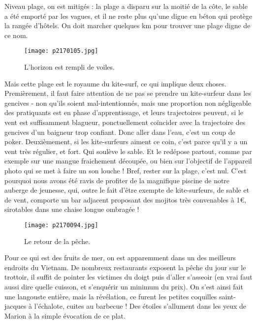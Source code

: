 \documentclass{book}
\begin{document}
Niveau plage, on est mitigés : la plage a disparu sur la moitié de la côte, le sable a été emporté par les vagues, et il ne reste plus qu'une digue en béton qui protège la rangée d'hôtels. On doit marcher quelques km pour trouver une plage digne de ce nom.


\begin{figure}[h]
\centering
\texttt{[image: p2170105.jpg]}
\caption*{L'horizon est rempli de voiles.}
\end{figure}

Mais cette plage est le royaume du kite-surf, ce qui implique deux choses. Premièrement, il faut faire attention de ne pas se prendre un kite-surfeur dans les gencives - non qu'ils soient mal-intentionnés, mais une proportion non négligeable des pratiquants est en phase d'apprentissage, et leurs trajectoires peuvent, si le vent est suffisamment blagueur, ponctuellement coïncider avec la trajectoire des gencives d'un baigneur trop confiant. Donc aller dans l'eau, c'est un coup de poker. Deuxièmement, si les kite-surfeurs aiment ce coin, c'est parce qu'il y a un vent très régulier, et fort. Qui soulève le sable. Et le redépose partout, comme par exemple sur une mangue fraichement découpée, ou bien sur l'objectif de l'appareil photo qui se met à faire un son louche ! Bref, rester sur la plage, c'est nul. C'est pourquoi nous avons été ravis de profiter de la magnifique piscine de notre auberge de jeunesse, qui, outre le fait d'être exempte de kite-surfeurs, de sable et de vent, comporte un bar adjacent proposant des mojitos très convenables à 1\euro, sirotables dans une chaise longue ombragée !



\begin{figure}[h]
\centering
\texttt{[image: p2170094.jpg]}
\caption*{Le retour de la pêche.}
\end{figure}


Pour ce qui est des fruits de mer, on est apparemment dans un des meilleurs endroits du Vietnam. De nombreux restaurants exposent la pêche du jour sur le trottoir, il suffit de pointer les victimes du doigt puis d'aller s'asseoir (en vrai faut aussi dire quelle cuisson, et s'enquérir un minimum du prix). On s'est ainsi fait une langouste entière, mais la révélation, ce furent les petites coquilles saint-jacques à l'échalote, cuites au barbecue ! Des étoiles s'allument dans les yeux de Marion à la simple évocation de ce plat.
\end{document}
